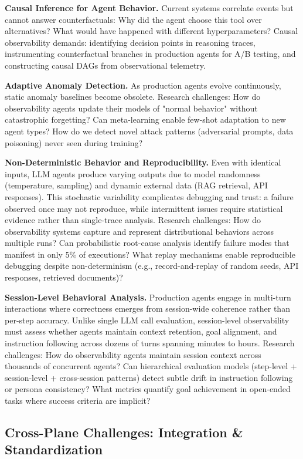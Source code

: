 \documentclass[sigplan,screen,9pt]{acmart}
\begin{document}
\textbf{Causal Inference for Agent Behavior.} Current systems correlate events but cannot answer counterfactuals: Why did the agent choose this tool over alternatives? What would have happened with different hyperparameters? Causal observability demands: identifying decision points in reasoning traces, instrumenting counterfactual branches in production agents for A/B testing, and constructing causal DAGs from observational telemetry.

\textbf{Adaptive Anomaly Detection.} As production agents evolve continuously, static anomaly baselines become obsolete. Research challenges: How do observability agents update their models of "normal behavior" without catastrophic forgetting? Can meta-learning enable few-shot adaptation to new agent types? How do we detect novel attack patterns (adversarial prompts, data poisoning) never seen during training?

\textbf{Non-Deterministic Behavior and Reproducibility.} Even with identical inputs, LLM agents produce varying outputs due to model randomness (temperature, sampling) and dynamic external data (RAG retrieval, API responses). This stochastic variability complicates debugging and trust: a failure observed once may not reproduce, while intermittent issues require statistical evidence rather than single-trace analysis. Research challenges: How do observability systems capture and represent distributional behaviors across multiple runs? Can probabilistic root-cause analysis identify failure modes that manifest in only 5\% of executions? What replay mechanisms enable reproducible debugging despite non-determinism (e.g., record-and-replay of random seeds, API responses, retrieved documents)?

\textbf{Session-Level Behavioral Analysis.} Production agents engage in multi-turn interactions where correctness emerges from session-wide coherence rather than per-step accuracy. Unlike single LLM call evaluation, session-level observability must assess whether agents maintain context retention, goal alignment, and instruction following across dozens of turns spanning minutes to hours. Research challenges: How do observability agents maintain session context across thousands of concurrent agents? Can hierarchical evaluation models (step-level + session-level + cross-session patterns) detect subtle drift in instruction following or persona consistency? What metrics quantify goal achievement in open-ended tasks where success criteria are implicit?

\subsection{Cross-Plane Challenges: Integration \& Standardization}
\end{document}
